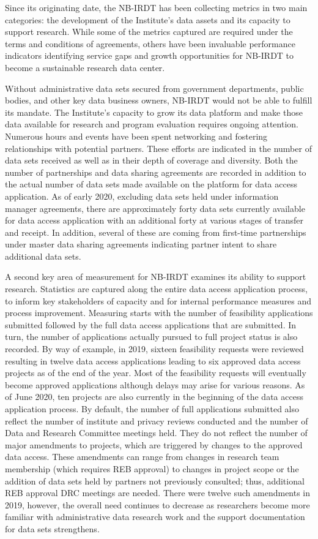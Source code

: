 \documentclass[
]{WileySix}
\begin{document}
Since its originating date, the NB-IRDT has been collecting metrics in two main categories: the development of the Institute's data assets and its capacity to support research. While some of the metrics captured are required under the terms and conditions of agreements, others have been invaluable performance indicators identifying service gaps and growth opportunities for NB-IRDT to become a sustainable research data center.

Without administrative data sets secured from government departments, public bodies, and other key data business owners, NB-IRDT would not be able to fulfill its mandate. The Institute's capacity to grow its data platform and make those data available for research and program evaluation requires ongoing attention. Numerous hours and events have been spent networking and fostering relationships with potential partners. These efforts are indicated in the number of data sets received as well as in their depth of coverage and diversity. Both the number of partnerships and data sharing agreements are recorded in addition to the actual number of data sets made available on the platform for data access application. As of early 2020, excluding data sets held under information manager agreements, there are approximately forty data sets currently available for data access application with an additional forty at various stages of transfer and receipt. In addition, several of these are coming from first-time partnerships under master data sharing agreements indicating partner intent to share additional data sets.

A second key area of measurement for NB-IRDT examines its ability to support research. Statistics are captured along the entire data access application process, to inform key stakeholders of capacity and for internal performance measures and process improvement. Measuring starts with the number of feasibility applications submitted followed by the full data access applications that are submitted. In turn, the number of applications actually pursued to full project status is also recorded. By way of example, in 2019, sixteen feasibility requests were reviewed resulting in twelve data access applications leading to six approved data access projects as of the end of the year. Most of the feasibility requests will eventually become approved applications although delays may arise for various reasons. As of June 2020, ten projects are also currently in the beginning of the data access application process. By default, the number of full applications submitted also reflect the number of institute and privacy reviews conducted and the number of Data and Research Committee meetings held. They do not reflect the number of major amendments to projects, which are triggered by changes to the approved data access. These amendments can range from changes in research team membership (which requires REB approval) to changes in project scope or the addition of data sets held by partners not previously consulted; thus, additional REB approval DRC meetings are needed. There were twelve such amendments in 2019, however, the overall need continues to decrease as researchers become more familiar with administrative data research work and the support documentation for data sets strengthens.
\end{document}
